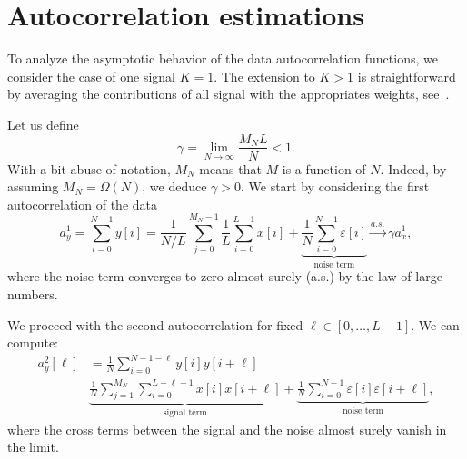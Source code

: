 \documentclass[english,11pt]{article}
\numberwithin{equation}{section}
\theoremstyle{plain}
\theoremstyle{definition}
\theoremstyle{remark}
\theoremstyle{plain}
\theoremstyle{remark}
\theoremstyle{plain}
\theoremstyle{plain}
\begin{document}







\appendix

\section{Autocorrelation estimations} \label{sec:autocorrelation_computation}
 
To analyze the asymptotic behavior of the data autocorrelation functions, we consider the case of one signal $K=1$. The extension to $K>1$ is straightforward by averaging the contributions of all signal with the appropriates weights, see~\cite{boumal2017heterogeneous}. 

Let us define
\begin{equation}
\gamma = \lim_{N\to\infty} \frac{M_NL}{N}<1.
\end{equation}
With a bit abuse of notation, $M_N$ means that $M$ is a function of $N$. Indeed, by assuming $M_N=\Omega(N)$, we deduce $\gamma>0$.
We start by considering the first autocorrelation of the data
\begin{equation}
a_y^1 = \sum_{i=0}^{N-1} y[i] = \frac{1}{N/L}\sum_{j=0}^{M_N-1}\frac{1}{L}\sum_{i=0}^{L-1}x[i] + \underbrace{\frac{1}{N}\sum_{i=0}^{N-1}\varepsilon[i]}_{\text{noise term}} \xrightarrow{a.s.}\gamma a_x^1,
\end{equation}
where the noise term converges to zero almost surely (a.s.) by the law of large numbers.

We proceed with the second autocorrelation for fixed $\ell\in[0,\ldots,L-1]$. We can compute:
\begin{equation}
\begin{split}
a_y^2[\ell] & = \frac{1}{N}\sum_{i=0}^{N-1-\ell}y[i]y[i+\ell] \\
& \underbrace{\frac{1}{N}\sum_{j=1}^{M_N}\sum_{i=0}^{L-\ell-1}x[i]x[i+\ell]}_{\text{signal term}} + \underbrace{\frac{1}{N}\sum_{i=0}^{N-1}\varepsilon[i]\varepsilon[i+\ell]}_{\text{noise term}},
\end{split}
\end{equation}
where the cross terms between the signal and the noise almost surely vanish in the limit. 
\end{document}
